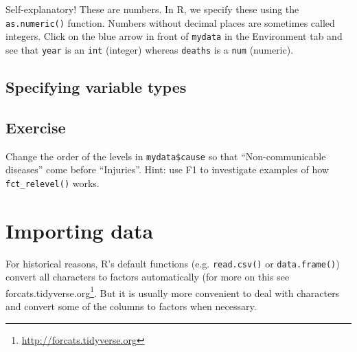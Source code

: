 \documentclass[]{book}
\makeatletter
\newenvironment{Shaded}{\begin{snugshade}}{\end{snugshade}}
\newcommand{\CommentTok}[1]{\textcolor[rgb]{0.56,0.35,0.01}{\textit{#1}}}
\newcommand{\KeywordTok}[1]{\textcolor[rgb]{0.13,0.29,0.53}{\textbf{#1}}}
\newcommand{\NormalTok}[1]{#1}
\newcommand{\OperatorTok}[1]{\textcolor[rgb]{0.81,0.36,0.00}{\textbf{#1}}}
\newcommand{\StringTok}[1]{\textcolor[rgb]{0.31,0.60,0.02}{#1}}
\let\rmarkdownfootnote\footnote%
\def\footnote{\protect\rmarkdownfootnote}
\renewcommand{\href}[2]{#2\footnote{\url{#1}}}
\newenvironment{kframe}{%
\medskip{}
\setlength{\fboxsep}{.8em}
 \def\at@end@of@kframe{}%
 \ifinner\ifhmode%
  \def\at@end@of@kframe{\end{minipage}}%
  \begin{minipage}{\columnwidth}%
 \fi\fi%
 \def\FrameCommand##1{\hskip\@totalleftmargin \hskip-\fboxsep
 \colorbox{shadecolor}{##1}\hskip-\fboxsep
     \hskip-\linewidth \hskip-\@totalleftmargin \hskip\columnwidth}%
 \MakeFramed {\advance\hsize-\width
   \@totalleftmargin\z@ \linewidth\hsize
   \@setminipage}}%
 {\par\unskip\endMakeFramed%
 \at@end@of@kframe}
\renewenvironment{Shaded}{\begin{kframe}}{\end{kframe}}
\theoremstyle{definition}
\theoremstyle{definition}
\theoremstyle{definition}
\theoremstyle{remark}
\makeatother
\begin{document}
Self-explanatory! These are numbers. In R, we specify these using the
\texttt{as.numeric()} function. Numbers without decimal places are
sometimes called integers. Click on the blue arrow in front of
\texttt{mydata} in the Environment tab and see that \texttt{year} is an
\texttt{int} (integer) whereas \texttt{deaths} is a \texttt{num}
(numeric).

\hypertarget{specifying-variable-types}{%
\subsection{Specifying variable types}\label{specifying-variable-types}}

\begin{Shaded}
\end{Shaded}

\hypertarget{exercise-7}{%
\subsection{Exercise}\label{exercise-7}}

Change the order of the levels in \texttt{mydata\$cause} so that
``Non-communicable diseases'' come before ``Injuries''. Hint: use F1 to
investigate examples of how \texttt{fct\_relevel()} works.

\hypertarget{importing-data}{%
\section{Importing data}\label{importing-data}}

For historical reasons, R's default functions (e.g. \texttt{read.csv()}
or \texttt{data.frame()}) convert all characters to factors
automatically (for more on this see
\href{http://forcats.tidyverse.org}{forcats.tidyverse.org}. But it is
usually more convenient to deal with characters and convert some of the
columns to factors when necessary.
\end{document}
